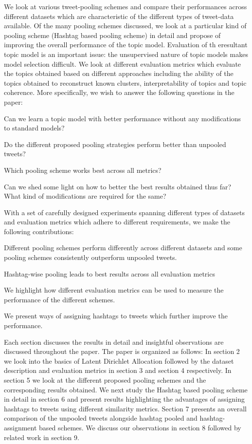 \documentclass[10pt,a5paper,twoside]{article}
\begin{document}
We look at various tweet-pooling schemes and compare their performances across different datasets which are characteristic of the different types of tweet-data available. Of the many pooling schemes discussed, we look at a particular kind of pooling scheme (Hashtag based pooling scheme) in detail and propose of improving the overall performance of the topic model. Evaluation of th eresultant topic model is an important issue: the unsupervised nature of topic models makes model selection difficult. We look at different evaluation metrics which evaluate the topics obtained based on different approaches including the ability of the topics obtained to reconstruct known clusters, interpretability of topics and topic coherence. More specifically, we wish to answer the following questions in the paper:
\begin{compactitem}
\item  Can we learn a topic model with better performance without any modifications to standard models?
\item Do the different proposed pooling strategies perform better than unpooled tweets?
\item Which pooling scheme works best across all metrics?
\item Can we shed some light on how to better the best results obtained thus far? What kind of modifications are required for the same?
\end{compactitem}

With a set of carefully designed experiments spanning different types of datasets and evaluation metrics which adhere to different requirements, we make the following contributions:
\begin{compactitem}
\item Different pooling schemes perform differently across different datasets and some pooling schemes consistently outperform unpooled tweets.
\item Hashtag-wise pooling leads to best results across all evaluation metrics
\item We highlight how different evaluation metrics can be used to measure the performance of the different schemes.
\item We present ways of assigning hashtags to tweets which further improve the performance.
\end{compactitem}

Each section discusses the results in detail and insightful observations are discussed throughout the paper. The paper is organized as follows: In section 2 we look into the basics of Latent Dirichlet Allocation followed by the dataset description and evaluation metrics in section 3 and section 4 respectively. In section 5 we look at the different proposed pooling schemes and the corresponding results obtained. We next study the Hashtag based pooling scheme in detail in section 6 and present results highlighting the advantages of assigning hashtags to tweets using different similarity metrics. Section 7 presents an overall comparison of the unpooled tweets alongside hashtag pooled and hashtag-assignment based schemes. We discuss our observations in section 8 followed by related work in section 9. 
\end{document}
